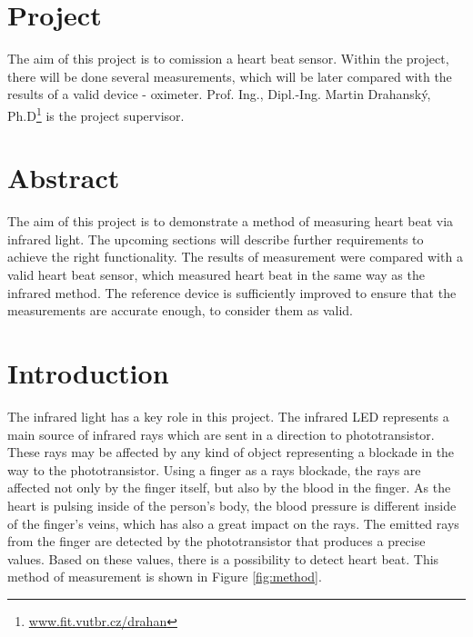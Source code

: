 \documentclass[11pt,a4paper]{article}
\newcommand{\tilda}{\raisebox{0.5ex}{\texttildelow}}
\begin{document}


\setlength{\parskip}{0pt}
\hypersetup{hidelinks}\tableofcontents
\setlength{\parskip}{0pt}

\newpage

\section{Project}

The aim of this project is to comission a heart beat sensor. Within the project, there will be done several measurements, which will be later compared with the results of a valid device - oximeter. Prof. Ing., Dipl.-Ing. Martin Drahanský, Ph.D\footnote{\href{http://www.fit.vutbr.cz/~drahan/}{www.fit.vutbr.cz/{\tilda}drahan}} is the project supervisor.

\section{Abstract}

The aim of this project is to demonstrate a method of measuring heart beat via infrared light. The upcoming sections will describe further requirements to achieve the right functionality. The results of measurement were compared with a valid heart beat sensor, which measured heart beat in the same way as the infrared method. The reference device is sufficiently improved to ensure that the measurements are accurate enough, to consider them as valid.

\section{Introduction}\label{sec:intro}

The infrared light has a key role in this project. The infrared LED represents a main source of infrared rays which are sent in a direction to phototransistor. These rays may be affected by any kind of object representing a blockade in the way to the phototransistor. Using a finger as a rays blockade, the rays are affected not only by the finger itself, but also by the blood in the finger. As the heart is pulsing inside of the person's body, the blood pressure is different inside of the finger's veins, which has also a great impact on the rays. The emitted rays from the finger are detected by the phototransistor that produces a precise values. Based on these values, there is a possibility to detect heart beat. This method of measurement is shown in Figure \ref{fig:method}.
\end{document}
